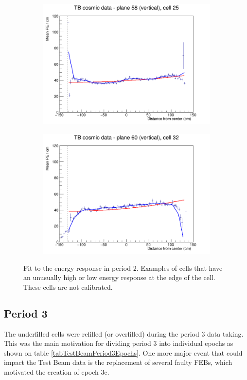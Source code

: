 \documentclass[12pt,a4paper]{article}
\begin{document}
\begin{figure}[h]
\begin{subfigure}{0.5\textwidth}
  \end{subfigure}
  \begin{subfigure}{0.5\textwidth}
    \includegraphics[width=\linewidth]{RelativeCalibrationResults/p2_058_025.png}
  \end{subfigure}
  \begin{subfigure}{0.5\textwidth}
    \includegraphics[width=\linewidth]{RelativeCalibrationResults/p2_060_032.png}
  \end{subfigure}
  \caption{Fit to the energy response in period 2. Examples of cells that have an unusually high or low energy response at the edge of the cell. These cells are not calibrated.}
  \label{figAttenfitResultsPerio2_CellEdge}
\end{figure}

\subsection{Period 3}
The underfilled cells were refilled (or overfilled) during the period 3 data taking. This was the main motivation for dividing period 3 into individual epochs as shown on table \ref{tabTestBeamPeriod3Epochs}. One more major event that could impact the Test Beam data is the replacement of several faulty FEBs, which motivated the creation of epoch 3e.
\end{document}
